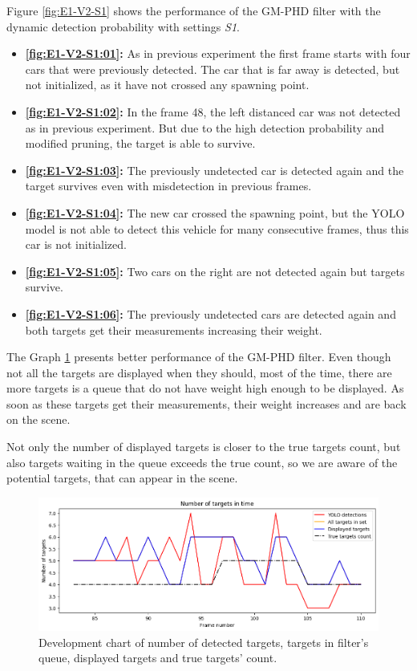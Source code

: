 Figure \ref{fig:E1-V2-S1} shows the performance of the GM-PHD filter with the dynamic detection probability with settings \textit{S1}.
\begin{itemize}
    \item \textbf{\ref{fig:E1-V2-S1:01}:} As in previous experiment the first frame starts with four cars that were previously detected. The car that is far away is detected, but not initialized, as it have not crossed any spawning point.
    \item \textbf{\ref{fig:E1-V2-S1:02}:} In the frame 48, the left distanced car was not detected as in previous experiment. But due to the high detection probability and modified pruning, the target is able to survive.
    \item \textbf{\ref{fig:E1-V2-S1:03}:} The previously undetected car is detected again and the target survives even with misdetection in previous frames.
    \item \textbf{\ref{fig:E1-V2-S1:04}:} The new car crossed the spawning point, but the YOLO model is not able to detect this vehicle for many consecutive frames, thus this car is not initialized.
    \item \textbf{\ref{fig:E1-V2-S1:05}:} Two cars on the right are not detected again but targets survive.
    \item \textbf{\ref{fig:E1-V2-S1:06}:} The previously undetected cars are detected again and both targets get their measurements increasing their weight.
\end{itemize}

The Graph \ref{gr:E1-V2-S1} presents better performance of the GM-PHD filter. Even though not all the targets are
displayed when they should, most of the time, there are more targets is a queue that do not have weight high enough to be displayed. As soon as these targets get their measurements, their weight increases and are back on the scene.

Not only the number of displayed targets is closer to the true targets count, but also targets waiting in the queue exceeds the true count, so we are aware of the potential targets, that can appear in the scene.

\begin{figure}[H]
    \centering
    \includegraphics[width=\linewidth]{../../../experiments/E1/V2/YOLO/yolo_det}
    \caption{Development chart of number of detected targets, targets in filter's queue, displayed targets and true targets' count.}
    \label{gr:E1-V2-S1}
\end{figure}

